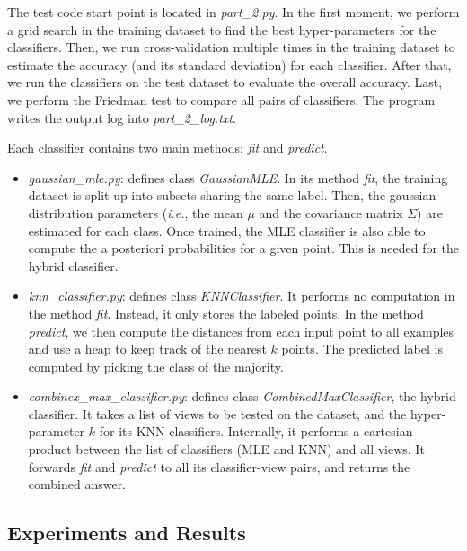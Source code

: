 \documentclass[conference]{IEEEtran}
\begin{document}
The test code start point is located in \textit{part\_2.py}.
In the first moment, we perform a grid search in the training dataset to find the best hyper-parameters for the classifiers.
Then, we run cross-validation multiple times in the training dataset to estimate the accuracy (and its standard deviation) for each classifier.
After that, we run the classifiers on the test dataset to evaluate the overall accuracy.
Last, we perform the Friedman test to compare all pairs of classifiers.
The program writes the output log into \textit{part\_2\_log.txt}.

Each classifier contains two main methods: \textit{fit} and \textit{predict}.
\begin{itemize}
\item \textit{gaussian\_mle.py}: defines class \textit{GaussianMLE}.
In its method \textit{fit}, the training dataset is split up into subsets sharing the same label.
Then, the gaussian distribution parameters (\textit{i.e.}, the mean $\mu$ and the covariance matrix $\Sigma$) are estimated for each class.
Once trained, the MLE classifier is also able to compute the a posteriori probabilities for a given point.
This is needed for the hybrid classifier.
\item \textit{knn\_classifier.py}: defines class \textit{KNNClassifier}.
It performs no computation in the method \textit{fit}.
Instead, it only stores the labeled points.
In the method \textit{predict}, we then compute the distances from each input point to all examples and use a heap to keep track of the nearest $k$ points.
The predicted label is computed by picking the class of the majority.
\item \textit{combinex\_max\_classifier.py}: defines class \textit{CombinedMaxClassifier}, the hybrid classifier.
It takes a list of views to be tested on the dataset, and the hyper-parameter $k$ for its KNN classifiers.
Internally, it performs a cartesian product between the list of classifiers (MLE and KNN) and all views.
It forwards \textit{fit} and \textit{predict} to all its classifier-view pairs, and returns the combined answer.

\end{itemize}

\subsection{Experiments and Results}
\end{document}
